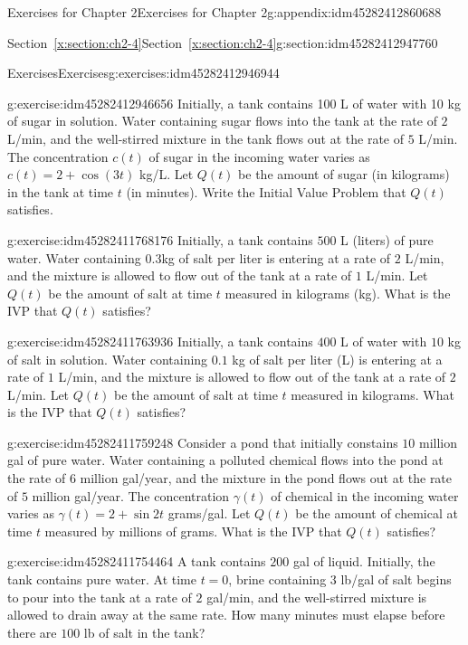 \documentclass[oneside,10pt,]{book}
\numberwithin{equation}{section}
\numberwithin{equation}{section}
\begin{document}
\begin{appendixptx}{Exercises for Chapter 2}{}{Exercises for Chapter 2}{}{}{g:appendix:idm45282412860688}
\begin{sectionptx}{Section~\ref*{x:section:ch2-4}}{}{Section~\ref*{x:section:ch2-4}}{}{}{g:section:idm45282412947760}
\begin{exercises-subsection-numberless}{Exercises}{}{Exercises}{}{}{g:exercises:idm45282412946944}
\begin{divisionexercise}{1}{}{}{g:exercise:idm45282412946656}
Initially, a tank contains 100 L of water with 10 kg of sugar in solution. Water containing sugar flows into the tank at the rate of \(2\) L\slash{}min, and the well-stirred mixture in the tank flows out at the rate of \(5\) L\slash{}min. The concentration \(c(t)\) of sugar in the incoming water varies as \(c(t)=2+\cos(3t)\) kg\slash{}L. Let \(Q(t)\) be the amount of sugar (in kilograms) in the tank at time \(t\) (in minutes). Write the Initial Value Problem that \(Q(t)\) satisfies.%
\end{divisionexercise}%
\begin{divisionexercise}{2}{}{}{g:exercise:idm45282411768176}%
Initially, a tank contains \(500\) L (liters) of pure water. Water containing \(0.3\)kg of salt per liter is entering at a rate of \(2\) L\slash{}min, and the mixture is allowed to flow out of the tank at a rate of \(1\) L\slash{}min. Let \(Q(t)\) be the amount of salt at time \(t\) measured in kilograms (kg). What is the IVP that \(Q(t)\) satisfies?%
\end{divisionexercise}%
\begin{divisionexercise}{3}{}{}{g:exercise:idm45282411763936}%
Initially, a tank contains \(400\) L of water with \(10\) kg of salt in solution. Water containing \(0.1\) kg of salt per liter (L) is entering at a rate of \(1\) L\slash{}min, and the mixture is allowed to flow out of the tank at a rate of \(2\) L\slash{}min. Let \(Q(t)\) be the amount of salt at time \(t\) measured in kilograms. What is the IVP that \(Q(t)\) satisfies?%
\end{divisionexercise}%
\begin{divisionexercise}{4}{}{}{g:exercise:idm45282411759248}%
Consider a pond that initially constains \(10\) million gal of pure water. Water containing a polluted chemical flows into the pond at the rate of \(6\) million gal\slash{}year, and the mixture in the pond flows out at the rate of \(5\) million gal\slash{}year. The concentration \(\gamma(t)\) of chemical in the incoming water varies as \(\gamma(t)=2+\sin2t\) grams\slash{}gal. Let \(Q(t)\) be the amount of chemical at time \(t\) measured by millions of grams. What is the IVP that \(Q(t)\) satisfies?%
\end{divisionexercise}%
\begin{divisionexercise}{5}{}{}{g:exercise:idm45282411754464}%
A tank contains \(200\) gal of liquid. Initially, the tank contains pure water. At time \(t=0\), brine containing \(3\) lb\slash{}gal of salt begins to pour into the tank at a rate of \(2\) gal\slash{}min, and the well-stirred mixture is allowed to drain away at the same rate. How many minutes must elapse before there are \(100\) lb of salt in the tank?%

\end{divisionexercise}
\end{exercises-subsection-numberless}
\end{sectionptx}
\end{appendixptx}
\end{document}
